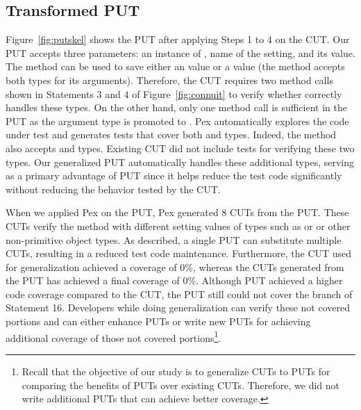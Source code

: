 \subsection{Transformed PUT}

Figure~\ref{fig:putskel} shows the PUT after applying Steps 1 to 4 on the CUT. Our PUT accepts three parameters: an instance of , name of the setting, and its value. The  method can be used to save either an  value or a  value (the method accepts both types for its arguments). Therefore, the CUT requires two method calls shown in Statements $3$ and $4$ of Figure~\ref{fig:connuit} to verify whether  correctly handles these types. On the other hand, only one method call is sufficient in the PUT as the argument type is promoted to . Pex automatically explores the code under test and generates tests that cover both  and  types. Indeed, the  method also accepts  and  types. Existing CUT did not include tests for verifying these two types. Our generalized PUT automatically handles these additional types, serving as a primary advantage of PUT since it helps reduce the test code significantly without reducing the behavior tested by the CUT.

When we applied Pex on the PUT, Pex generated $8$ CUTs from the PUT. These CUTs verify the  method with different setting values of types such as  or  or other non-primitive object types. As described, a single PUT can substitute multiple CUTs, resulting in a reduced test code maintenance. Furthermore, the CUT used for generalization achieved a coverage of $0$\%, whereas the CUTs generated from the PUT has achieved a final coverage of $0$\%. Although PUT achieved a higher code coverage compared to the CUT, the PUT still could not cover the  branch of Statement 16. Developers while doing generalization can verify these not covered portions and can either enhance PUTs or write new PUTs for achieving additional coverage of those not covered portions\footnote{Recall that the objective of our study is to generalize CUTs to PUTs for comparing the benefits of PUTs over existing CUTs. Therefore, we did not write additional PUTs that can achieve better coverage.}. 

